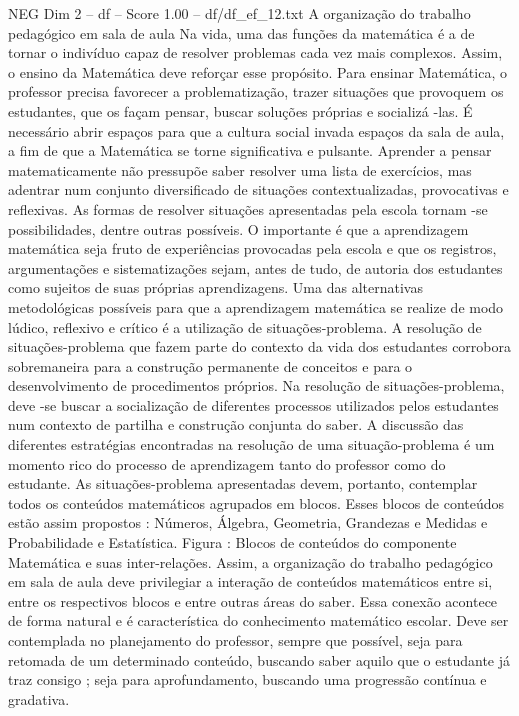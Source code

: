 \begin{textsample}{NEG Dim 2 – df – Score 1.00 – df/df\_ef\_12.txt}  \label{ex:f2_neg_165}
A organização do trabalho pedagógico em sala de aula Na vida, uma das funções da matemática é a de tornar o indivíduo capaz de resolver problemas cada vez mais complexos.
Assim, o ensino da Matemática deve reforçar esse propósito.
Para ensinar Matemática, o professor precisa favorecer a problematização, trazer situações que provoquem os estudantes, que os façam pensar, buscar soluções próprias e socializá -las.
É necessário abrir espaços para que a cultura social invada espaços da sala de aula, a fim de que a Matemática se torne significativa e pulsante.
Aprender a pensar matematicamente não pressupõe saber resolver uma lista de exercícios, mas adentrar num conjunto diversificado de situações contextualizadas, provocativas e reflexivas.
As formas de resolver situações apresentadas pela escola tornam -se possibilidades, dentre outras possíveis.
O importante é que a aprendizagem matemática seja fruto de experiências provocadas pela escola e que os registros, argumentações e sistematizações sejam, antes de tudo, de autoria dos estudantes como sujeitos de suas próprias aprendizagens.
Uma das alternativas metodológicas possíveis para que a aprendizagem matemática se realize de modo lúdico, reflexivo e crítico é a utilização de situações-problema.
A resolução de situações-problema que fazem parte do contexto da vida dos estudantes corrobora sobremaneira para a construção permanente de conceitos e para o desenvolvimento de procedimentos próprios.
Na resolução de situações-problema, deve -se buscar a socialização de diferentes processos utilizados pelos estudantes num contexto de partilha e construção conjunta do saber.
A discussão das diferentes estratégias encontradas na resolução de uma situação-problema é um momento rico do processo de aprendizagem tanto do professor como do estudante.
As situações-problema apresentadas devem, portanto, contemplar todos os conteúdos matemáticos agrupados em blocos.
Esses blocos de conteúdos estão assim propostos : Números, Álgebra, Geometria, Grandezas e Medidas e Probabilidade e Estatística.
Figura : Blocos de conteúdos do componente Matemática e suas inter-relações.
Assim, a organização do trabalho pedagógico em sala de aula deve privilegiar a interação de conteúdos matemáticos entre si, entre os respectivos blocos e entre outras áreas do saber.
Essa conexão acontece de forma natural e é característica do conhecimento matemático escolar.
Deve ser contemplada no planejamento do professor, sempre que possível, seja para retomada de um determinado conteúdo, buscando saber aquilo que o estudante já traz consigo ; seja para aprofundamento, buscando uma progressão contínua e gradativa.

\end{textsample}
